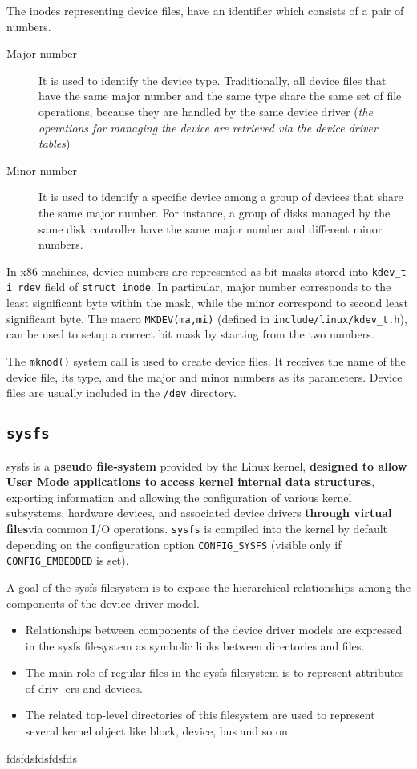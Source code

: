 \documentclass[10pt,a4paper]{article}
\begin{document}
The inodes representing device files, have an identifier which consists of a pair of numbers. 

\begin{description}

\item[Major number] It is used to identify the device type. Traditionally, all device files that have the same major number and the same type share the same set of file operations, because they are handled by the same device driver (\textit{the operations for managing the device are retrieved via the device driver tables})
\item[Minor number] It is used to identify a specific device among a group of devices that share the same major number. For instance, a group of disks managed by the same disk controller have the same major number and different minor numbers.
\end{description}

In x86 machines, device numbers are represented as bit masks stored into \texttt{kdev\_t i\_rdev} field of \texttt{struct inode}. In particular, major number corresponds to the least significant byte within the mask, while the minor correspond to second least significant byte. The macro \texttt{MKDEV(ma,mi)} (defined in \texttt{include/linux/kdev\_t.h}), can be used to setup a correct bit mask by starting from the two numbers.

The \texttt{mknod()} system call is used to create device files. It receives the name of the device file, its type, and the major and minor numbers as its parameters. Device files are usually included in the \texttt{/dev} directory.

\subsection{\texttt{sysfs}}

sysfs is a \textbf{pseudo file-system} provided by the Linux kernel, \textbf{designed to allow User Mode applications to access kernel internal data structures}, exporting information and allowing the configuration of various kernel subsystems, hardware devices, and associated device drivers \textbf{through virtual files}via common I/O operations. \texttt{sysfs} is compiled into the kernel by default depending on the configuration option \texttt{CONFIG\_SYSFS} (visible only if \texttt{CONFIG\_EMBEDDED} is set).


A goal of the sysfs filesystem is to expose the hierarchical relationships among the components of the device driver model. 
\begin{itemize}
\item Relationships between components of the device driver models are expressed in the sysfs filesystem as symbolic links between directories and files.
\item The main role of regular files in the sysfs filesystem is to represent attributes of driv-
ers and devices. 
\item The related top-level directories of this filesystem are used to represent several kernel object like block, device, bus and so on.

\end{itemize}

fdsfdsfdsfdsfds
\end{document}
